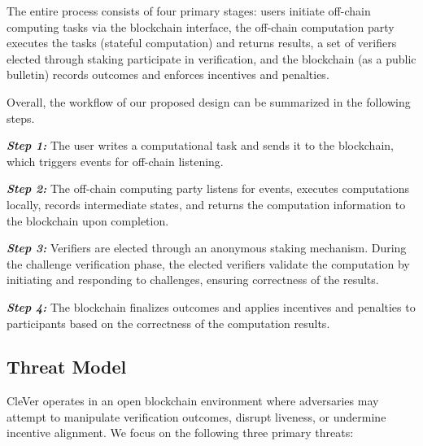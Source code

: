 \documentclass[3p]{elsarticle}
\theoremstyle{remark}
\begin{document}
The entire process consists of four primary stages: users initiate off-chain computing tasks via the blockchain interface, the off-chain computation party executes the tasks (stateful computation) and returns results, a set of verifiers elected through staking participate in verification, and the blockchain (as a public bulletin) records outcomes and enforces incentives and penalties.

Overall, the workflow of our proposed design can be summarized in the following steps.

\textit{\textbf{Step 1:}} The user writes a computational task and sends it to the blockchain, which triggers events for off-chain listening.

\textit{\textbf{Step 2:}} The off-chain computing party listens for events, executes computations locally, records intermediate states, and returns the computation information to the blockchain upon completion.

\textit{\textbf{Step 3:}} Verifiers are elected through an anonymous staking mechanism. During the challenge verification phase, the elected verifiers validate the computation by initiating and responding to challenges, ensuring correctness of the results.

\textit{\textbf{Step 4:}} The blockchain finalizes outcomes and applies incentives and penalties to participants based on the correctness of the computation results.

\subsection{Threat Model}

CleVer operates in an open blockchain environment where adversaries may attempt to manipulate verification outcomes, disrupt liveness, or undermine incentive alignment. We focus on the following three primary threats:
\end{document}
